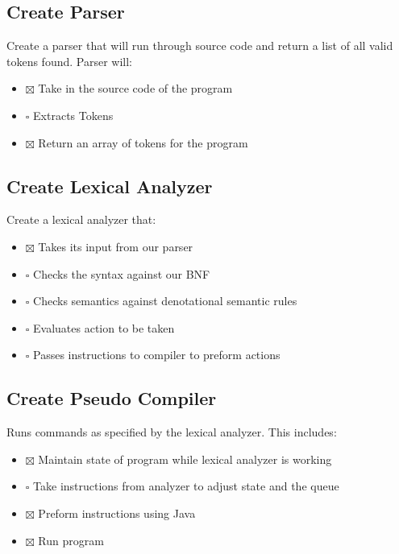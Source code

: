 \documentclass[11pt]{article}
\begin{document}
\subsection{Create Parser}
\label{sec:orgc6a0c75}
Create a parser that will run through source code and return a list of all valid tokens found. Parser will:
\begin{itemize}
\item $\boxtimes$ Take in the source code of the program
\item $\square$ Extracts Tokens
\item $\boxtimes$ Return an array of tokens for the program
\end{itemize}
\subsection{Create Lexical Analyzer}
\label{sec:orgad028c9}
Create a lexical analyzer that:
\begin{itemize}
\item $\boxtimes$ Takes its input from our parser
\item $\square$ Checks the syntax against our BNF
\item $\square$ Checks semantics against denotational semantic rules
\item $\square$ Evaluates action to be taken
\item $\square$ Passes instructions to compiler to preform actions
\end{itemize}
\subsection{Create Pseudo Compiler}
\label{sec:org1762bbd}
Runs commands as specified by the lexical analyzer. This includes:
\begin{itemize}
\item $\boxtimes$ Maintain state of program while lexical analyzer is working
\item $\square$ Take instructions from analyzer to adjust state and the queue
\item $\boxtimes$ Preform instructions using Java
\item $\boxtimes$ Run program
\end{itemize}
\end{document}
